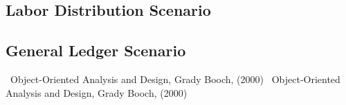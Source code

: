 \documentclass[12pt,notitlepage]{article}
\begin{document}
\begin{s5presentation}
  \begin{ifhtml}
    \begin{s5slide}
      \section{Labor Distribution Scenario}
    \end{s5slide}
  \end{ifhtml}

  \begin{ifhtml}
    \begin{s5slide}
      \section{General Ledger Scenario}
      \begin{figure}
      \end{figure}
    \end{s5slide}
  \end{ifhtml}

  \W \end{s5presentation}
  \begin{tex}
    \begin{thebibliography}{20}
     ~Object-Oriented Analysis and Design, Grady Booch, (2000) 
     ~Object-Oriented Analysis and Design, Grady Booch, (2000) 
    \end{thebibliography}
  \end{tex}
\end{document}
